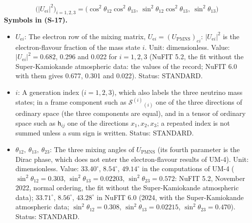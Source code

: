 \documentclass[
  10pt,
]{article}
\providecommand{\tightlist}{%
  \setlength{\itemsep}{0pt}\setlength{\parskip}{0pt}}
\begin{document}
\[
\big(\lvert U_{\mathrm{e}i}\rvert^2\big)_{i = 1, 2, 3} = \big(\cos^2\theta_{12}\cos^2\theta_{13},\ \sin^2\theta_{12}\cos^2\theta_{13},\ \sin^2\theta_{13}\big) \tag{S-17}
\] \textbf{Symbols in (S-17).}

\begin{itemize}
\tightlist
\item
  \(U_{\mathrm{e}i}\): The electron row of the mixing matrix,
  \(U_{\mathrm{e}i} = (U_{\mathrm{PMNS}})_{ei}\):
  \(\lvert U_{\mathrm{e}i}\rvert^2\) is the electron-flavour fraction of
  the mass state \(i\). Unit: dimensionless. Value:
  \(\lvert U_{\mathrm{e}i}\rvert^2 = 0.682\), 0.296 and 0.022 for
  \(i = 1, 2, 3\) (NuFIT 5.2, the fit without the Super-Kamiokande
  atmospheric data: the values of the record; NuFIT 6.0 with them gives
  0.677, 0.301 and 0.022). Status: STANDARD.
\item
  \(i\): A generation index (\(i = 1, 2, 3\)), which also labels the
  three neutrino mass states; in a frame component such as
  \(\mathcal{S}^{(i)}{}_{(i)}\) one of the three directions of ordinary
  space (the three components are equal), and in a tensor of ordinary
  space such as \(\mathsf{h}_{ij}\) one of the directions
  \(x_1, x_2, x_3\); a repeated index is not summed unless a sum sign is
  written. Status: STANDARD.
\item
  \(\theta_{12},\ \theta_{13},\ \theta_{23}\): The three mixing angles
  of \(U_{\mathrm{PMNS}}\) (its fourth parameter is the Dirac phase,
  which does not enter the electron-flavour results of UM-4). Unit:
  dimensionless. Value: \(33.40^\circ\), \(8.54^\circ\), \(49.14^\circ\)
  in the computations of UM-4 (\(\sin^2\theta_{12} = 0.303\),
  \(\sin^2\theta_{13} = 0.02203\), \(\sin^2\theta_{23} = 0.572\): NuFIT
  5.2, November 2022, normal ordering, the fit without the
  Super-Kamiokande atmospheric data); \(33.71^\circ\), \(8.56^\circ\),
  \(43.28^\circ\) in NuFIT 6.0 (2024, with the Super-Kamiokande
  atmospheric data; \(\sin^2\theta_{12} = 0.308\),
  \(\sin^2\theta_{13} = 0.02215\), \(\sin^2\theta_{23} = 0.470\)).
  Status: STANDARD.
\end{itemize}
\end{document}
